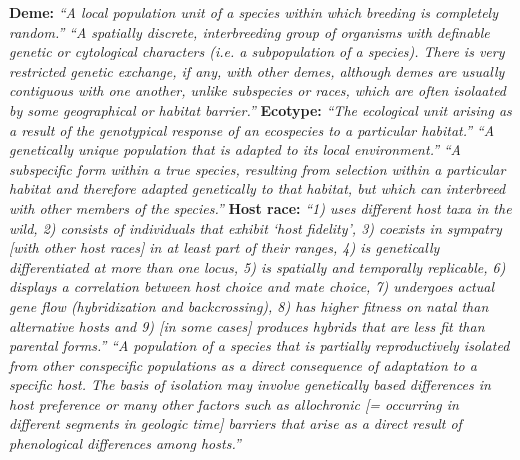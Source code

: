 \textbf{Deme:} \textit{``A local population unit of a species within which breeding is completely random.''} \citep{hendersonDictionary} \newline
\textit{``A spatially discrete, interbreeding group of organisms with definable genetic or cytological characters (i.e. a subpopulation of a species). There is very restricted genetic exchange, if any, with other demes, although demes are usually contiguous with one another, unlike subspecies or races, which are often isolaated by some geographical or habitat barrier.''} \citep{allaby1992concise} \newline \newline 
\textbf{Ecotype:} \textit{``The ecological unit arising as a result of the genotypical response of an ecospecies to a particular habitat.''} \citep{turrill1946ecotype} \newline 
\textit{``A genetically unique population that is adapted to its local environment.''} \citep{turesson1922genotypical} \newline 
\textit{``A subspecific form within a true species, resulting from selection within a particular habitat and therefore adapted genetically to that habitat, but which can interbreed with other members of the species.''} \citep{hendersonDictionary} \newline \newline 
\textbf{Host race:} \textit{``1) uses different host taxa in the wild, 2) consists of individuals that exhibit `host fidelity', 3) coexists in sympatry [with other host races] in at least part of their ranges, 4) is genetically differentiated at more than one locus, 5) is spatially and temporally replicable, 6) displays a correlation between host choice and mate choice, 7) undergoes actual gene flow (hybridization and backcrossing), 8) has higher fitness on natal than alternative hosts and 9) [in some cases] produces hybrids that are less fit than parental forms.''} \citep{dres2002host} \newline
\textit{``A population of a species that is partially reproductively isolated from other conspecific populations as a direct consequence of adaptation to a specific host. The basis of isolation may involve genetically based differences in host preference or many other factors such as allochronic [= occurring in different segments in geologic time] barriers that arise as a direct result of phenological differences among hosts.''} \citep{Diehl1984AnBiotypes} \newline \newline

